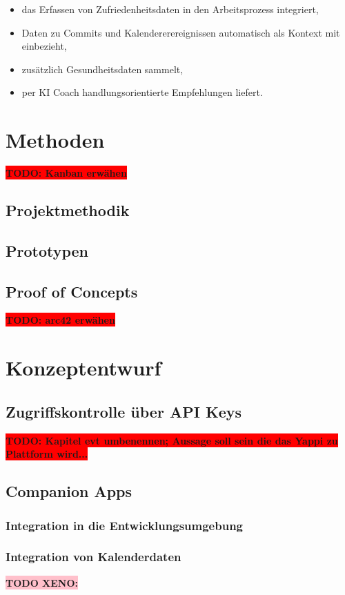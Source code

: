 \documentclass[12pt,a4paper]{report}
\newcommand{\todo}[1]{\colorbox{red}{\textbf{TODO: #1}}\\}
\newcommand{\xeno}[1]{\colorbox{pink}{\textbf{TODO XENO: #1}}\\}
\begin{document}
\begin{itemize}
	\item das Erfassen von Zufriedenheitsdaten in den Arbeitsprozess integriert,
	\item Daten zu Commits und Kalendererereignissen automatisch als Kontext mit einbezieht,
	\item zusätzlich Gesundheitsdaten sammelt,
	\item per KI Coach handlungsorientierte Empfehlungen liefert.
\end{itemize}

\chapter{Methoden}
\todo{Kanban erwähen}
\section{Projektmethodik}
\section{Prototypen}
\section{Proof of Concepts}

\todo{arc42 erwähen}

\chapter{Konzeptentwurf}
\section{Zugriffskontrolle über API Keys}

\todo{Kapitel evt umbenennen; Aussage soll sein die das Yappi zu Plattform wird...}

\section{Companion Apps}
\subsection{Integration in die Entwicklungsumgebung}
\subsection{Integration von Kalenderdaten}
\xeno{}
\end{document}
